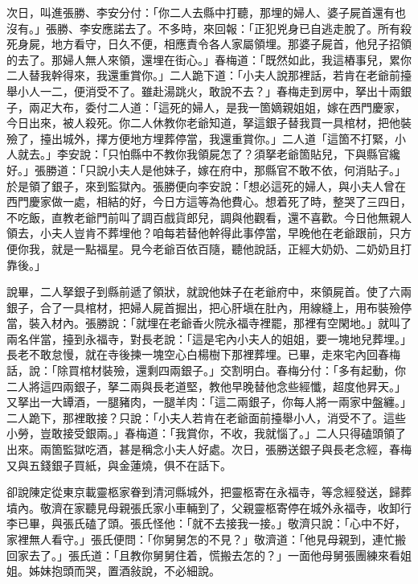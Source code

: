 次日，叫進張勝、李安分付：「你二人去縣中打聽，那埋的婦人、婆子屍首還有也沒有。」張勝、李安應諾去了。不多時，來回報：「正犯兇身已自逃走脫了。所有殺死身屍，地方看守，日久不便，相應責令各人家屬領埋。那婆子屍首，他兒子招領的去了。那婦人無人來領，還埋在街心。」春梅道：「既然如此，我這樁事兒，累你二人替我幹得來，我還重賞你。」二人跪下道：「小夫人說那裡話，若肯在老爺前擡舉小人一二，便消受不了。雖赴湯跳火，敢說不去？」春梅走到房中，拏出十兩銀子，兩疋大布，委付二人道：「這死的婦人，是我一箇嫡親姐姐，嫁在西門慶家，今日出來，被人殺死。你二人休教你老爺知道，拏這銀子替我買一具棺材，把他裝殮了，擡出城外，擇方便地方埋葬停當，我還重賞你。」二人道「這箇不打緊，小人就去。」李安說：「只怕縣中不教你我領屍怎了？須拏老爺箇貼兒，下與縣官纔好。」張勝道：「只說小夫人是他妹子，嫁在府中，那縣官不敢不依，何消貼子。」於是領了銀子，來到監獄內。張勝便向李安說：「想必這死的婦人，與小夫人曾在西門慶家做一處，相結的好，今日方這等為他費心。想着死了時，整哭了三四日，不吃飯，直教老爺門前叫了調百戲貨郎兒，調與他觀看，還不喜歡。今日他無親人領去，小夫人豈肯不葬埋他？咱每若替他幹得此事停當，早晚他在老爺跟前，只方便你我，就是一點福星。{}見今老爺百依百隨，聽他說話，正經大奶奶、二奶奶且打靠後。」

說畢，二人拏銀子到縣前遞了領狀，就說他妹子在老爺府中，來領屍首。使了六兩銀子，合了一具棺材，把婦人屍首掘出，把心肝塡在肚內，用線縫上，用布裝殮停當，裝入材內。{}張勝說：「就埋在老爺香火院永福寺裡罷，那裡有空閑地。」就叫了兩名伴當，擡到永福寺，對長老說：「這是宅內小夫人的姐姐，要一塊地兒葬埋。」長老不敢怠慢，就在寺後揀一塊空心白楊樹下那裡葬埋。已畢，走來宅內回春梅話，說：「除買棺材裝殮，還剩四兩銀子。」交割明白。春梅分付：「多有起動，你二人將這四兩銀子，拏二兩與長老道堅，教他早晚替他念些經懺，超度他昇天。」又拏出一大罈酒，一腿豬肉，一腿羊肉：「這二兩銀子，你每人將一兩家中盤纏。」二人跪下，那裡敢接？只說：「小夫人若肯在老爺面前擡舉小人，消受不了。這些小勞，豈敢接受銀兩。」春梅道：「我賞你，不收，我就惱了。」二人只得磕頭領了出來。兩箇監獄吃酒，甚是稱念小夫人好處。{}次日，張勝送銀子與長老念經，春梅又與五錢銀子買紙，與金蓮燒，俱不在話下。

卻說陳定從東京載靈柩家眷到清河縣城外，把靈柩寄在永福寺，等念經發送，歸葬墳內。敬濟在家聽見母親張氏家小車輛到了，父親靈柩寄停在城外永福寺，收卸行李已畢，與張氏磕了頭。張氏怪他：「就不去接我一接。」{}敬濟只說：「心中不好，家裡無人看守。」張氏便問：「你舅舅怎的不見？」敬濟道：「他見母親到，連忙搬回家去了。」張氏道：「且教你舅舅住着，慌搬去怎的？」一面他母舅張團練來看姐姐。姊妹抱頭而哭，置酒敍說，不必細說。

